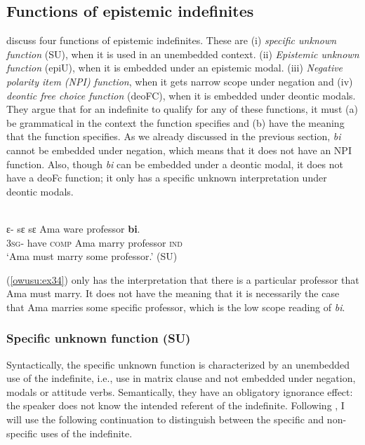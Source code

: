 \documentclass[output=paper,modfonts,nonflat,draftmode]{langsci/langscibook}
\begin{document}
\subsection{Functions of epistemic indefinites}

\citet{AloniPort2015} discuss four functions of epistemic indefinites. These are (i) \emph{specific unknown function} (SU), when it is used in an unembedded context. (ii) \emph{Epistemic unknown function} (epiU), when it is embedded under an epistemic modal. (iii) \emph{Negative polarity item (NPI) function}, when it gets narrow scope under negation and (iv) \emph{deontic free choice function} (deoFC), when it is embedded under deontic modals. They argue that for an indefinite to qualify for any of these functions, it must (a) be grammatical in the context the function specifies and (b) have the meaning that the function specifies. As we already discussed in the previous section, \emph{bi} cannot be embedded under negation, which means that it does not have an NPI function. Also, though \emph{bi} can be embedded under a deontic modal, it does not have a deoFc function; it only has a specific unknown interpretation under deontic modals. 

\ea\label{owusu:ex34}\\
 \gll ε- sε  sε Ama ware professor \textbf{bi}.\\
\textsc{3sg}- have \textsc{comp} Ama marry professor \textsc{ind} \\
    
\glt `Ama must marry some professor.' (SU)

\z (\ref{owusu:ex34}) only has the interpretation that there is a particular professor that Ama must marry. It does not have the meaning that it is necessarily the case that Ama marries some specific professor, which is the low scope reading of \emph{bi}. 



\subsubsection{Specific unknown function (SU)}
Syntactically, the specific unknown function is characterized by an unembedded use of the indefinite, i.e., use in matrix clause and not embedded under negation, modals or attitude verbs. Semantically, they have an obligatory ignorance effect: the speaker does not know the intended referent of the indefinite. Following \citet{AloniPort2015}, I will use the following continuation to distinguish between the specific and non-specific uses of the indefinite.
\end{document}
